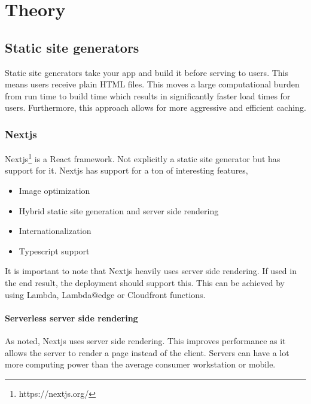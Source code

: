 
\chapter{Theory} %

\label{Chapter3} 


\section{Static site generators}

Static site generators take your app and build it before serving to users. 
This means users receive plain HTML files. This moves a large computational burden from run time to build time which results in significantly faster load times for users.
Furthermore, this approach allows for more aggressive and efficient caching.

\subsection{Nextjs}

Nextjs\footnote{https://nextjs.org/} is a React framework. Not explicitly a static site generator but has support for it. 
Nextjs has support for a ton of interesting features, 

\begin{itemize}
	\item Image optimization
	\item Hybrid static site generation and server side rendering
	\item Internationalization
	\item Typescript support
\end{itemize}

It is important to note that Nextjs heavily uses server side rendering. If used in the end result, the deployment should support this. 
This can be achieved by using Lambda, Lambda@edge or Cloudfront functions.  

\subsubsection{Serverless server side rendering}

As noted, Nextjs uses server side rendering. 
This improves performance as it allows the server to render a page instead of the client.
Servers can have a lot more computing power than the average consumer workstation or mobile.

